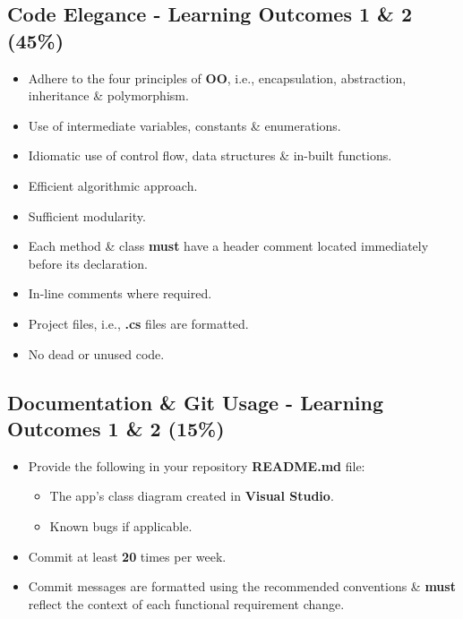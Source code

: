 \documentclass{article}
\begin{document}
\subsection*{Code Elegance - Learning Outcomes 1 \& 2  (45\%)}
\begin{itemize}
    \item Adhere to the four principles of \textbf{OO}, i.e., encapsulation, abstraction, inheritance \& polymorphism.
    \item Use of intermediate variables, constants \& enumerations.
    \item Idiomatic use of control flow, data structures \& in-built functions.
    \item Efficient algorithmic approach.
    \item Sufficient modularity.
    \item Each method \& class \textbf{must} have a header comment located immediately before its declaration.
    \item In-line comments where required. 
    \item Project files, i.e., \textbf{.cs} files are formatted. 
    \item No dead or unused code.
\end{itemize}

\subsection*{Documentation \& Git Usage - Learning Outcomes 1 \& 2 (15\%)}
\begin{itemize}
    \item Provide the following in your repository \textbf{README.md} file:
    \begin{itemize}
        \item The app's class diagram created in \textbf{Visual Studio}.
        \item Known bugs if applicable.
    \end{itemize}
    \item Commit at least \textbf{20} times per week.
    \item Commit messages are formatted using the recommended conventions \& \textbf{must} reflect the context of each functional requirement change.
\end{itemize}
\end{document}
